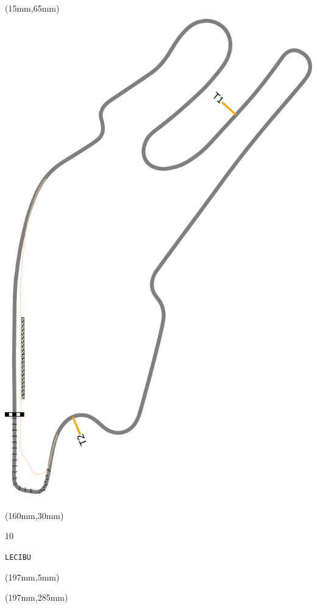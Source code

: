 \begin{textblock*}{185mm}(15mm,65mm)%
\centering
\mbox{\includegraphics[width=185mm,height=210mm,keepaspectratio]{PT/LECIBU.pdf}}
\end{textblock*}
\begin{textblock*}{40mm}(160mm,30mm)%
\Large
\par{} 
\par10 
\par\hfill\tiny\tt LECIBU\\
\end{textblock*}
\begin{textblock*}{20mm}(197mm,5mm)%
\fbox{\thepage}
\label{LECIBU}
\end{textblock*}
\begin{textblock*}{20mm}(197mm,285mm)%
\fbox{\thepage}
\end{textblock*}

